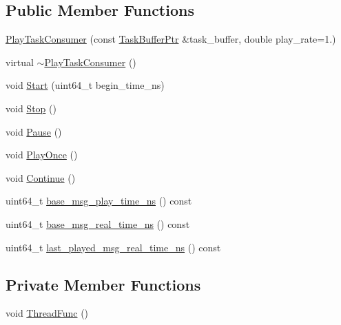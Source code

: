 \subsection*{Public Member Functions}
\begin{DoxyCompactItemize}
\item 
\hyperlink{classapollo_1_1cyber_1_1record_1_1PlayTaskConsumer_ab7f35c6eb0dd42c3ace65e2b621697d5}{Play\-Task\-Consumer} (const \hyperlink{classapollo_1_1cyber_1_1record_1_1PlayTaskConsumer_aaec143d18559ee0406ab272d8cbaab2e}{Task\-Buffer\-Ptr} \&task\-\_\-buffer, double play\-\_\-rate=1.)
\item 
virtual \hyperlink{classapollo_1_1cyber_1_1record_1_1PlayTaskConsumer_a9de397f0ef677c03f0b408522422f04e}{$\sim$\-Play\-Task\-Consumer} ()
\item 
void \hyperlink{classapollo_1_1cyber_1_1record_1_1PlayTaskConsumer_ab597d60b9ec88fa2083185f3d8d7b5eb}{Start} (uint64\-\_\-t begin\-\_\-time\-\_\-ns)
\item 
void \hyperlink{classapollo_1_1cyber_1_1record_1_1PlayTaskConsumer_a9e007fa78aa0ff9a085121a3fb14547d}{Stop} ()
\item 
void \hyperlink{classapollo_1_1cyber_1_1record_1_1PlayTaskConsumer_a9ff80ad33c5d3c9d85e752cd853a9013}{Pause} ()
\item 
void \hyperlink{classapollo_1_1cyber_1_1record_1_1PlayTaskConsumer_a93c44f6d7a711e8404802578d68a61db}{Play\-Once} ()
\item 
void \hyperlink{classapollo_1_1cyber_1_1record_1_1PlayTaskConsumer_afd87654910feff4c942433d2c96885c7}{Continue} ()
\item 
uint64\-\_\-t \hyperlink{classapollo_1_1cyber_1_1record_1_1PlayTaskConsumer_ad080c04d05610530507f5df290f36162}{base\-\_\-msg\-\_\-play\-\_\-time\-\_\-ns} () const 
\item 
uint64\-\_\-t \hyperlink{classapollo_1_1cyber_1_1record_1_1PlayTaskConsumer_a09d0e4ae820aad2c70ffcaf0e1778f68}{base\-\_\-msg\-\_\-real\-\_\-time\-\_\-ns} () const 
\item 
uint64\-\_\-t \hyperlink{classapollo_1_1cyber_1_1record_1_1PlayTaskConsumer_a8bd0e222eeb2ce7bbf3e464991cd8021}{last\-\_\-played\-\_\-msg\-\_\-real\-\_\-time\-\_\-ns} () const 
\end{DoxyCompactItemize}
\subsection*{Private Member Functions}
\begin{DoxyCompactItemize}
\item 
void \hyperlink{classapollo_1_1cyber_1_1record_1_1PlayTaskConsumer_a1cd9d11456b01845fa9bfcbbb0a87b99}{Thread\-Func} ()
\end{DoxyCompactItemize}
